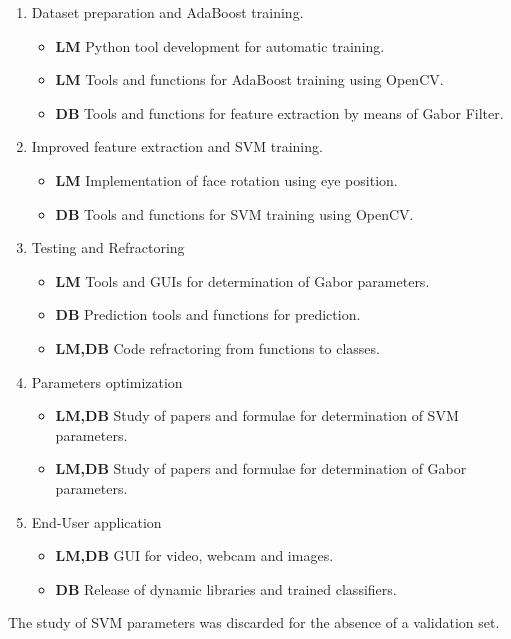 \begin{enumerate}
  \item Dataset preparation and AdaBoost training.
    \begin{itemize}
      \item \textbf{LM} Python tool development for automatic training.
      \item \textbf{LM} Tools and functions for AdaBoost training using OpenCV.
      \item \textbf{DB} Tools and functions for feature extraction by means of Gabor Filter.
    \end{itemize}
  \item Improved feature extraction and SVM training.
    \begin{itemize}
      \item \textbf{LM} Implementation of face rotation using eye position.
      \item \textbf{DB} Tools and functions for SVM training using OpenCV.
    \end{itemize}
  \item Testing and Refractoring
    \begin{itemize}
      \item \textbf{LM} Tools and GUIs for determination of Gabor parameters.
      \item \textbf{DB} Prediction tools and functions for prediction.
      \item \textbf{LM,DB} Code refractoring from functions to classes.
    \end{itemize}
  \item Parameters optimization
    \begin{itemize}
      \item \textbf{LM,DB} Study of papers and formulae for determination of
        SVM parameters.
      \item \textbf{LM,DB} Study of papers and formulae for determination of
        Gabor parameters.
    \end{itemize}
  \item End-User application
    \begin{itemize}
      \item \textbf{LM,DB} GUI for video, webcam and images.
      \item \textbf{DB} Release of dynamic libraries and trained classifiers.
    \end{itemize}
\end{enumerate}

The study of SVM parameters was discarded for the absence of a validation set.
